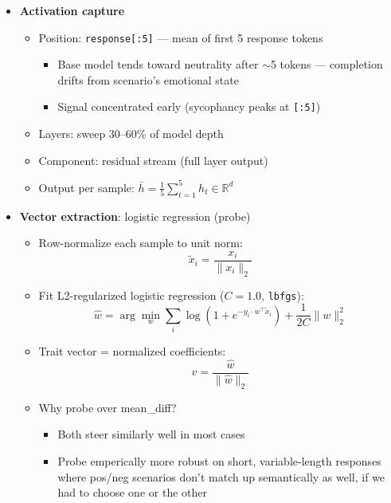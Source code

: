 \documentclass[11pt]{article}
\begin{document}
\begin{itemize}
  \item \textbf{Activation capture}
  \begin{itemize}
    \item Position: \texttt{response[:5]} --- mean of first 5 response tokens
    \begin{itemize}
      \item Base model tends toward neutrality after $\sim$5 tokens --- completion drifts from scenario's emotional state
      \item Signal concentrated early (sycophancy peaks at \texttt{[:5]})
    \end{itemize}
    \item Layers: sweep 30--60\% of model depth
    \item Component: residual stream (full layer output)
    \item Output per sample: $\bar{h} = \frac{1}{5}\sum_{t=1}^{5} h_t \in \mathbb{R}^{d}$
  \end{itemize}

  \item \textbf{Vector extraction}: logistic regression (probe)
  \begin{itemize}
    \item Row-normalize each sample to unit norm:
    \begin{equation}
      \tilde{x}_i = \frac{x_i}{\|x_i\|_2}
    \end{equation}
    \item Fit L2-regularized logistic regression ($C=1.0$, \texttt{lbfgs}):
    \begin{equation}
      \hat{w} = \arg\min_w \sum_i \log(1 + e^{-y_i \cdot w^\top \tilde{x}_i}) + \frac{1}{2C}\|w\|_2^2
    \end{equation}
    \item Trait vector = normalized coefficients:
    \begin{equation}
      v = \frac{\hat{w}}{\|\hat{w}\|_2}
    \end{equation}
    \item Why probe over mean\_diff?
    \begin{itemize}
      \item Both steer similarly well in most cases
      \item Probe emperically more robust on short, variable-length responses where pos/neg scenarios don't match up semantically as well, if we had to choose one or the other
    \end{itemize}
  \end{itemize}


\end{itemize}
\end{document}
